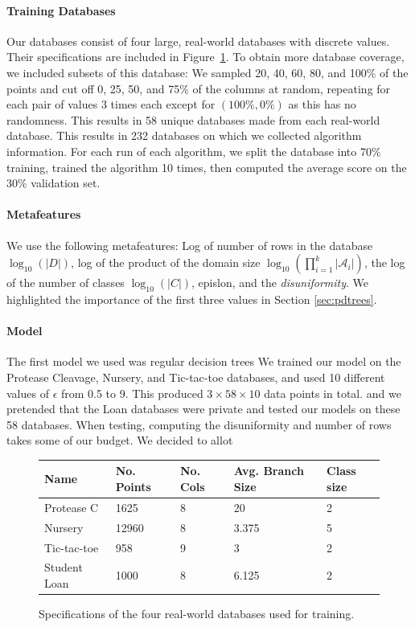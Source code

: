 \documentclass[11pt]{report}
\begin{document}
\paragraph{Training Databases}
Our databases consist of four large, real-world databases with discrete values. Their specifications are included in Figure~\ref{fig:dbinfo}. To obtain more database coverage, we included subsets of this database: We sampled 20, 40, 60, 80, and 100\% of the points and cut off 0, 25, 50, and 75\% of the columns at random, repeating for each pair of values 3 times each except for $(100\%, 0\%)$ as this has no randomness. This results in 58 unique databases made from each real-world database. This results in 232 databases on which we collected algorithm information. For each run of each algorithm, we split the database into 70\% training, trained the algorithm 10 times, then computed the average score on the 30\% validation set.

\paragraph{Metafeatures} We use the following metafeatures: Log of number of rows in the database $\log_{10}(|D|)$, log of the product of the domain size $\log_{10}\left(\prod_{i=1}^k|\mathcal{A}_i|\right)$, the log of the number of classes $\log_{10}(|C|)$, epislon, and the \emph{disuniformity}. We highlighted the importance of the first three values in Section \ref{sec:pdtrees}.

\paragraph{Model} 
The first model we used was regular decision trees  We trained our model on the Protease Cleavage, Nursery, and Tic-tac-toe databases, and used 10 different values of $\epsilon$ from 0.5 to 9. This produced $3\times 58 \times 10$ data points in total. and we pretended that the Loan databases were private and tested our models on these 58 databases. When testing, computing the disuniformity and number of rows takes some of our budget. We decided to allot
\begin{figure}
\begin{center}
\begin{tabular}{|p{3cm}|l|l|l|l|}
\hline
Name & No. Points & No. Cols & Avg. Branch Size & Class size \\ \hline
Protease C & 1625 & 8 & 20 & 2 \\ \hline
Nursery & 12960 & 8 & 3.375 & 5 \\ \hline
Tic-tac-toe & 958 & 9 & 3 & 2 \\ \hline
Student Loan & 1000 & 8 & 6.125 & 2 \\ \hline
\end{tabular}
\end{center}
\caption{Specifications of the four real-world databases used for training.}\label{fig:dbinfo}
\end{figure}
\end{document}
